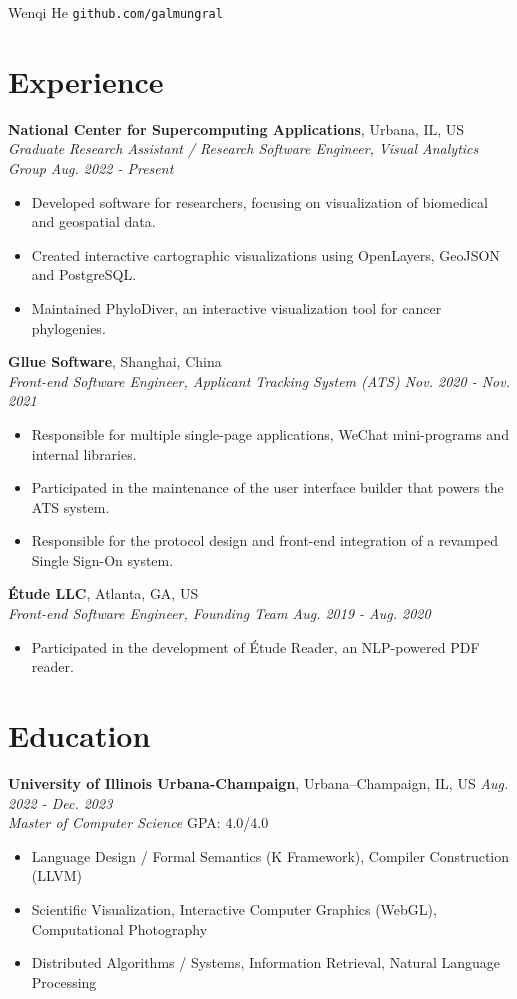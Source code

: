 \documentclass[12pt]{article}
\begin{document}
{\Huge Wenqi He} \quad \texttt{github.com/galmungral}

\section*{Experience}
\textbf{National Center for Supercomputing Applications}, Urbana, IL, US\\
\textit{\textit{Graduate Research Assistant / Research Software Engineer}, Visual Analytics Group \hfill Aug. 2022 - Present}
\begin{itemize}
\item Developed software for researchers, focusing on visualization of biomedical and geospatial data.
\item Created interactive cartographic visualizations using OpenLayers, GeoJSON and PostgreSQL.
\item Maintained PhyloDiver, an interactive visualization tool for cancer phylogenies.
\end{itemize}
\vspace{0.5em}
\textbf{Gllue Software}, Shanghai, China\\
\textit{Front-end Software Engineer, Applicant Tracking System (ATS) \hfill Nov. 2020 - Nov. 2021}
\begin{itemize}
\item Responsible for multiple single-page applications, WeChat mini-programs and internal libraries.
\item Participated in the maintenance of the user interface builder that powers the ATS system.
\item Responsible for the protocol design and front-end integration of a revamped Single Sign-On system.
\end{itemize}
\vspace{0.5em}
\textbf{Étude LLC}, Atlanta, GA, US\\
\textit{Front-end Software Engineer, Founding Team \hfill Aug. 2019 - Aug. 2020}
\begin{itemize}
\item Participated in the development of Étude Reader, an NLP-powered PDF reader.
\end{itemize}

\section*{Education}
\textbf{University of Illinois Urbana-Champaign}, Urbana–Champaign, IL, US \hfill \textit{Aug. 2022 - Dec. 2023} \\
\textit{Master of Computer Science}  \hfill GPA: 4.0/4.0 
\begin{itemize}
\item Language Design / Formal Semantics (K Framework), Compiler Construction (LLVM)
\item Scientific Visualization, Interactive Computer Graphics (WebGL), Computational Photography
\item Distributed Algorithms / Systems, Information Retrieval, Natural Language Processing
\end{itemize}
\end{document}
